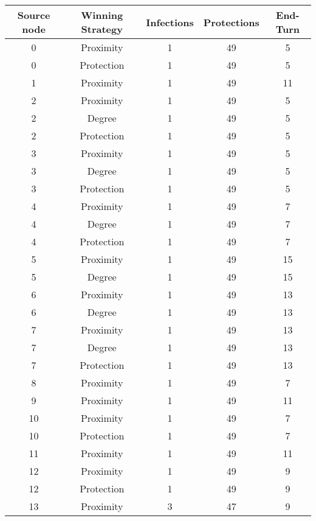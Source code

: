 \documentclass[results.tex]{subfiles}
\begin{document}
\begin{center}
  \begin{tabular}{| c || c | c | c | c |}
    \hline
    {\bfseries Source node} & {\bfseries Winning Strategy} & {\bfseries Infections} & {\bfseries Protections} & {\bfseries End-Turn} \\  %
    \hline\hline
    0 & Proximity & 1 & 49 & 5 \\ 
    \hline
    0 & Protection & 1 & 49 & 5 \\ 
    \hline
    1 & Proximity & 1 & 49 & 11 \\ 
    \hline
    2 & Proximity & 1 & 49 & 5 \\ 
    \hline
    2 & Degree & 1 & 49 & 5 \\ 
    \hline
    2 & Protection & 1 & 49 & 5 \\ 
    \hline
    3 & Proximity & 1 & 49 & 5 \\ 
    \hline
    3 & Degree & 1 & 49 & 5 \\ 
    \hline
    3 & Protection & 1 & 49 & 5 \\ 
    \hline
    4 & Proximity & 1 & 49 & 7 \\ 
    \hline
    4 & Degree & 1 & 49 & 7 \\ 
    \hline
    4 & Protection & 1 & 49 & 7 \\ 
    \hline
    5 & Proximity & 1 & 49 & 15 \\ 
    \hline
    5 & Degree & 1 & 49 & 15 \\ 
    \hline
    6 & Proximity & 1 & 49 & 13 \\ 
    \hline
    6 & Degree & 1 & 49 & 13 \\ 
    \hline
    7 & Proximity & 1 & 49 & 13 \\ 
    \hline
    7 & Degree & 1 & 49 & 13 \\ 
    \hline
    7 & Protection & 1 & 49 & 13 \\ 
    \hline
    8 & Proximity & 1 & 49 & 7 \\ 
    \hline
    9 & Proximity & 1 & 49 & 11 \\ 
    \hline
    10 & Proximity & 1 & 49 & 7 \\ 
    \hline
    10 & Protection & 1 & 49 & 7 \\ 
    \hline
    11 & Proximity & 1 & 49 & 11 \\ 
    \hline
    12 & Proximity & 1 & 49 & 9 \\ 
    \hline
    12 & Protection & 1 & 49 & 9 \\ 
    \hline
    13 & Proximity & 3 & 47 & 9 \\ 

\end{tabular}
\end{center}
\end{document}
